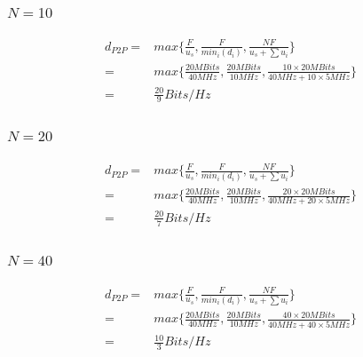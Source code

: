 \documentclass{article}
\begin{document}
            \subsubsection*{$N=10$}
                \begin{equation*}
                    \begin{split}
                        d_{P2P}=&max\{\frac{F}{u_s},\frac{F}{{min}_i(d_i)},\frac{NF}{u_s+\sum u_i}\}\\
                            =&max\{\frac{20MBits}{40MHz},\frac{20MBits}{10MHz},\frac{10\times 20MBits }{40MHz+10\times 5MHz}\}\\
                            =&\frac{20}{9}Bits/Hz
                    \end{split}
                \end{equation*}
            \subsubsection*{$N=20$}
                \begin{equation*}
                    \begin{split}
                        d_{P2P}=&max\{\frac{F}{u_s},\frac{F}{{min}_i(d_i)},\frac{NF}{u_s+\sum u_i}\}\\
                            =&max\{\frac{20MBits}{40MHz},\frac{20MBits}{10MHz},\frac{20\times 20MBits }{40MHz+20\times 5MHz}\}\\
                            =&\frac{20}{7}Bits/Hz
                    \end{split}
                \end{equation*}
            \subsubsection*{$N=40$}
                \begin{equation*}
                    \begin{split}
                        d_{P2P}=&max\{\frac{F}{u_s},\frac{F}{{min}_i(d_i)},\frac{NF}{u_s+\sum u_i}\}\\
                            =&max\{\frac{20MBits}{40MHz},\frac{20MBits}{10MHz},\frac{40\times 20MBits }{40MHz+40\times 5MHz}\}\\
                            =&\frac{10}{3}Bits/Hz
                    \end{split}
                \end{equation*}
\end{document}
